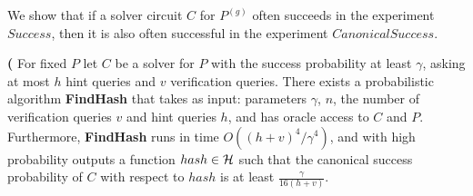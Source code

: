 We show that if a solver circuit $C$ for $P^{(g)}$ often succeeds in the experiment $Success$, then it is
also often successful in the experiment $CanonicalSuccess$.

\begin{lemma}\textbf{(}
\label{lemma:hash_function_probability}
For fixed $P$ let $C$ be a solver for $P$ with the success probability at least $\gamma$,
asking at most $h$ hint queries and $v$ verification queries.
There exists a probabilistic algorithm \textbf{FindHash} that takes as input:
parameters $\gamma$, $n$, the number of verification queries $v$ and hint queries $h$, and has
oracle access to $C$ and $P$. Furthermore, \textbf{FindHash} runs in time $O((h+v)^4/\gamma^4)$,
and with high probability outputs a function $hash \in \mathcal{H}$
such that the canonical success probability of $C$ with respect to $hash$ is at least $\frac{\gamma}{16(h+v)}$.
\end{lemma}
%
